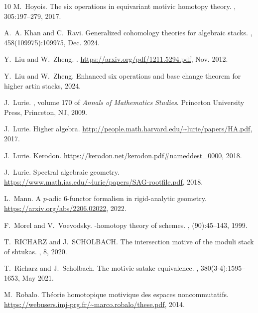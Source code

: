 \documentclass[14pt]{article}
\theoremstyle{definition}
\numberwithin{subsection}{section}
\begin{document}
\begin{thebibliography}{10}
M.~Hoyois.
\newblock The six operations in equivariant motivic homotopy theory.
, 305:197--279, 2017.

A.~A. Khan and C.~Ravi.
\newblock Generalized cohomology theories for algebraic stacks.
, 458(109975):109975, Dec. 2024.

Y.~{Liu} and W.~{Zheng}.
.
\newblock \url{https://arxiv.org/pdf/1211.5294.pdf}, Nov. 2012.

Y.~Liu and W.~Zheng.
\newblock Enhanced six operations and base change theorem for higher artin
  stacks, 2024.

J.~Lurie.
, volume 170 of {\em Annals of Mathematics
  Studies}.
\newblock Princeton University Press, Princeton, NJ, 2009.

J.~Lurie.
\newblock Higher algebra.
\newblock \url{http://people.math.harvard.edu/~lurie/papers/HA.pdf}, 2017.

J.~Lurie.
\newblock Kerodon.
\newblock \url{https://kerodon.net/kerodon.pdf#nameddest=0000}, 2018.

J.~Lurie.
\newblock Spectral algebraic geometry.
\newblock \url{https://www.math.ias.edu/~lurie/papers/SAG-rootfile.pdf}, 2018.

L.~Mann.
\newblock A $p$-adic 6-functor formalism in rigid-analytic geometry.
\newblock \url{https://arxiv.org/abs/2206.02022}, 2022.

F.~Morel and V.~Voevodsky.
-homotopy theory of schemes.
, (90):45--143, 1999.

T.~RICHARZ and J.~SCHOLBACH.
\newblock The intersection motive of the moduli stack of shtukas.
, 8, 2020.

T.~Richarz and J.~Scholbach.
\newblock The motivic satake equivalence.
, 380(3-4):1595–1653, May 2021.

M.~Robalo.
\newblock Th\'eorie homotopique motivique des espaces noncommutatifs.
\newblock \url{https://webusers.imj-prg.fr/~marco.robalo/these.pdf}, 2014.


\end{thebibliography}
\end{document}

